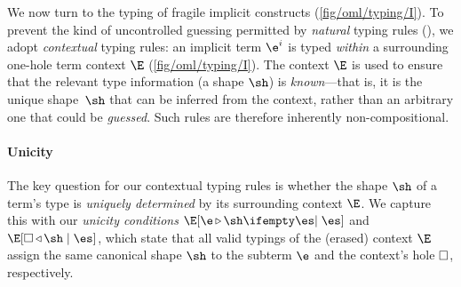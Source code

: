 \documentclass[acmsmall,screen,nonacm%
\Anonymous{,anonymous}{}%
\Final{}{,review}%
]{acmart}
\begin{document}

We now turn to the typing of fragile implicit constructs
(\cref{fig/oml/typing/I}). To prevent the kind of uncontrolled guessing
permitted by \emph{natural} typing rules (\eg {}), we adopt
\emph{contextual} typing rules: an implicit term $\e^i$ is typed \emph{within}
a surrounding one-hole term context $\E$ (\cref{fig/oml/typing/I}). The context
$\E$ is used to ensure that the relevant type information (\eg a shape $\sh$)
is \emph{known}---that is, it is the unique shape~$\sh$ that can be inferred
from the context, rather than an arbitrary one that could be \emph{guessed}.
Such rules are therefore inherently non-compositional.

\paragraph{Unicity}


The key question for our contextual typing rules is whether the shape $\sh$ of
a term's type is \emph{uniquely determined} by its surrounding context $\E$. We
capture this with our \emph{unicity conditions} $\eshape[\es] \E \e \sh$ and
$\Eshape \E \es \sh$, which state that all valid typings of the (erased)
context $\E$ assign the same canonical shape $\sh$ to the subterm $\e$ and the
context's hole $\square$, respectively.
\end{document}

